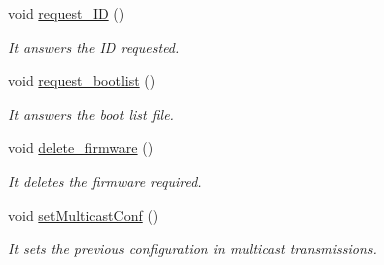 \begin{DoxyCompactItemize}
void \hyperlink{class_wasp_x_bee_core_a62b2f7cf6540e258c0efee1c6ce59918}{request\+\_\+\+ID} ()
\begin{DoxyCompactList}\small\item\em It answers the ID requested. \end{DoxyCompactList}\item 
void \hyperlink{class_wasp_x_bee_core_afca9c2bb65717a4e5164093c9fa97ffd}{request\+\_\+bootlist} ()
\begin{DoxyCompactList}\small\item\em It answers the boot list file. \end{DoxyCompactList}\item 
void \hyperlink{class_wasp_x_bee_core_a333c0ed977bf7bc0d0407597939d269e}{delete\+\_\+firmware} ()
\begin{DoxyCompactList}\small\item\em It deletes the firmware required. \end{DoxyCompactList}\item 
void \hyperlink{class_wasp_x_bee_core_a5e579944b87af01825c8243b36b602da}{set\+Multicast\+Conf} ()
\begin{DoxyCompactList}\small\item\em It sets the previous configuration in multicast transmissions. \end{DoxyCompactList}\end{DoxyCompactItemize}
